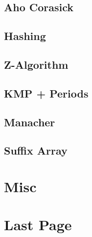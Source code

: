 \documentclass[twocolumn]{article}
\begin{document}
		\subsection{Aho Corasick}
			
		\subsection{Hashing}
			
		\subsection{Z-Algorithm}
			
		\subsection{KMP + Periods}
			
		\subsection{Manacher}
			
		\subsection{Suffix Array}
			
	\section{Misc}

	\newpage

	\section{Last Page}
\end{document}
